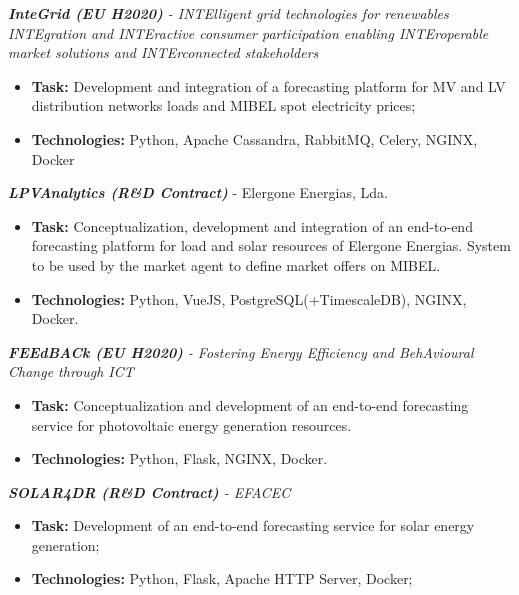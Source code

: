 \documentclass{mycv}
\begin{document}
{\begin{myitemize}
	\vspace{0.15cm}	
	\item \textit{\textbf{InteGrid (EU H2020)} - INTElligent grid technologies for renewables INTEgration and INTEractive consumer participation enabling INTEroperable market solutions and INTErconnected stakeholders}
	\begin{itemize}
		\item \textbf{Task:} Development and integration of a forecasting platform for MV and LV distribution networks loads and MIBEL spot electricity prices;
		\item \textbf{Technologies:} Python, Apache Cassandra, RabbitMQ, Celery, NGINX, Docker
	\end{itemize}
	
	
	\vspace{0.15cm}	
	\item \textit{\textbf{LPVAnalytics (R\&D Contract)}} - Elergone Energias, Lda.
	\begin{itemize}
		\item \textbf{Task:} Conceptualization, development and integration of an end-to-end forecasting platform for load and solar resources of Elergone Energias. System to be used by the market agent to define market offers on MIBEL.
		\item \textbf{Technologies:} Python, VueJS, PostgreSQL(+TimescaleDB), NGINX, Docker.
	\end{itemize}
	
	\vspace{0.15cm}	
	\item \textit{\textbf{FEEdBACk (EU H2020)} - Fostering Energy Efficiency and BehAvioural Change through ICT}
	\begin{itemize}
		\item \textbf{Task:} Conceptualization and development of an end-to-end forecasting service for photovoltaic energy generation resources.
		\item \textbf{Technologies:} Python, Flask, NGINX, Docker.
	\end{itemize}
	
	\vspace{0.15cm}	
	\item \textit{\textbf{SOLAR4DR (R\&D Contract)} - EFACEC}
	\begin{itemize}
		\item \textbf{Task:} Development of an end-to-end forecasting service for solar energy generation;
		\item \textbf{Technologies:} Python, Flask, Apache HTTP Server, Docker;
	\end{itemize}
	

\end{myitemize}}
\end{document}
